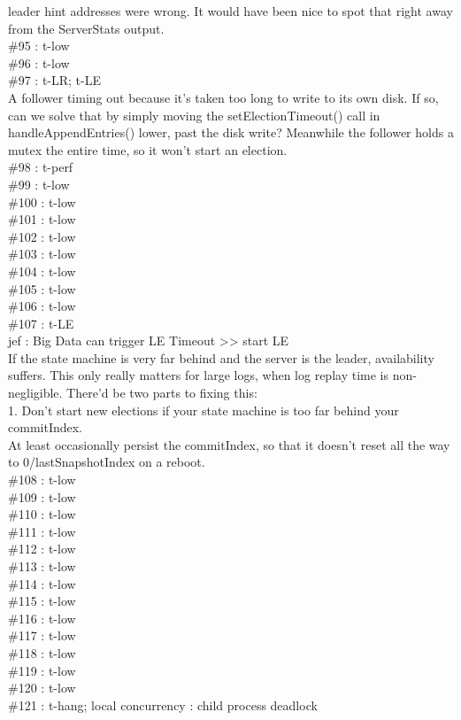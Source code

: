 leader hint addresses were wrong. It would have been nice to spot that right away 
from the ServerStats output.\\
\#95 : t-low\\
\#96 : t-low\\
\#97 : t-LR; t-LE\\
A follower timing out because it's taken too long to write to its own disk. If 
so, can we solve that by simply moving the setElectionTimeout() call in 
handleAppendEntries() lower, past the disk write? Meanwhile the follower holds 
a mutex the entire time, so it won't start an election.\\
\#98 : t-perf\\
\#99 : t-low\\
\#100 : t-low\\
\#101 : t-low\\
\#102 : t-low\\
\#103 : t-low\\
\#104 : t-low\\
\#105 : t-low\\
\#106 : t-low\\
\#107 : t-LE\\
jef : Big Data can trigger LE Timeout >> start LE\\
If the state machine is very far behind and the server is the leader, availability 
suffers. This only really matters for large logs, when log replay time is 
non-negligible. There'd be two parts to fixing this:\\
1. Don't start new elections if your state machine is too far behind your 
commitIndex.\\
At least occasionally persist the commitIndex, so that it doesn't reset all the 
way to 0/lastSnapshotIndex on a reboot.\\
\#108 : t-low\\
\#109 : t-low\\
\#110 : t-low\\
\#111 : t-low\\
\#112 : t-low\\
\#113 : t-low\\
\#114 : t-low\\
\#115 : t-low\\
\#116 : t-low\\
\#117 : t-low\\
\#118 : t-low\\
\#119 : t-low\\
\#120 : t-low\\
\#121 : t-hang; local concurrency : child process deadlock\\
